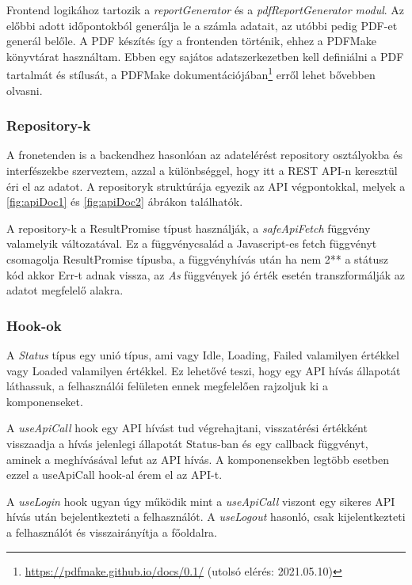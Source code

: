Frontend logikához tartozik a \textit{reportGenerator} és a \textit{pdfReportGenerator modul}. Az előbbi adott időpontokból generálja le a számla adatait, az utóbbi pedig PDF-et generál belőle. A PDF készítés így a frontenden történik, ehhez a PDFMake könyvtárat használtam. Ebben egy sajátos adatszerkezetben kell definiálni a PDF tartalmát és stílusát, a PDFMake dokumentációjában\footnote{\url{https://pdfmake.github.io/docs/0.1/} (utolsó elérés: 2021.05.10)} erről lehet bővebben olvasni.

\subsubsection{Repository-k}

A fronetenden is a backendhez hasonlóan az adatelérést repository osztályokba és interfészekbe szerveztem, azzal a különbséggel, hogy itt a REST API-n keresztül éri el az adatot. A repositoryk struktúrája egyezik az API végpontokkal, melyek a \ref{fig:apiDoc1} és \ref{fig:apiDoc2} ábrákon találhatók.

A repository-k a ResultPromise típust használják, a \textit{safeApiFetch} függvény valamelyik változatával. Ez a függvénycsalád a Javascript-es fetch függvényt csomagolja ResultPromise típusba, a függvényhívás után ha nem 2** a státusz kód akkor Err-t adnak vissza, az \textit{As} függvények jó érték esetén transzformálják az adatot megfelelő alakra. 

\subsubsection{Hook-ok}

A \textit{Status} típus egy unió típus, ami vagy Idle, Loading, Failed valamilyen értékkel vagy Loaded valamilyen értékkel. Ez lehetővé teszi, hogy egy API hívás állapotát láthassuk, a felhasználói felületen ennek megfelelően rajzoljuk ki a komponenseket.

A \textit{useApiCall} hook egy API hívást tud végrehajtani, visszatérési értékként visszaadja a hívás jelenlegi állapotát Status-ban és egy callback függvényt, aminek a meghívásával lefut az API hívás. A komponensekben legtöbb esetben ezzel a useApiCall hook-al érem el az API-t.

A \textit{useLogin} hook ugyan úgy működik mint a \textit{useApiCall} viszont egy sikeres API hívás után bejelentkezteti a felhasználót. A \textit{useLogout} hasonló, csak kijelentkezteti a felhasználót és visszairányítja a főoldalra.

